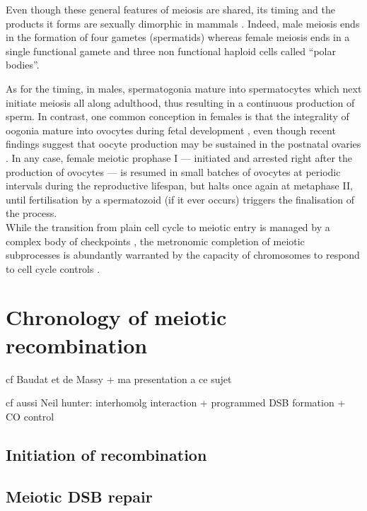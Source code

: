 Even though these general features of meiosis are shared, its timing and the products it forms are sexually dimorphic in mammals \citep[reviewed in][]{handel2010genetics}. 
Indeed, male meiosis ends in the formation of four gametes (spermatids) whereas female meiosis ends in a single functional gamete and three non functional haploid cells called “polar bodies”.

As for the timing, in males, spermatogonia mature into spermatocytes which next initiate meiosis all along adulthood, thus resulting in a continuous production of sperm.
In contrast, one common conception in females is that the integrality of oogonia mature into ovocytes during fetal development \citep{pearl1921studies,zuckerman1951number}, even though recent findings suggest that oocyte production may be sustained in the postnatal ovaries \citep{johnson2004germline,johnson2005oocyte}.
In any case, female meiotic prophase I — initiated and arrested right after the production of ovocytes — is resumed in small batches of ovocytes at periodic intervals during the reproductive lifespan, but halts once again at metaphase II, until fertilisation by a spermatozoid (if it ever occurs) triggers the finalisation of the process.\\

While the transition from plain cell cycle to meiotic entry is managed by a complex body of checkpoints \citep[reviewed in][]{marston2005meiosis}, the metronomic completion of meiotic subprocesses is abundantly warranted by the capacity of chromosomes to respond to cell cycle controls \citep[reviewed in][]{mckim1995chromosomal}.












\section{Chronology of meiotic recombination}
cf Baudat et de Massy + ma presentation a ce sujet

cf aussi Neil hunter: interhomolg interaction + programmed DSB formation + CO control

\subsection{Initiation of recombination}
\subsection{Meiotic DSB repair}

